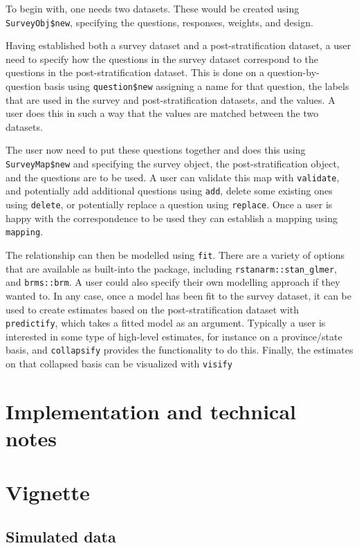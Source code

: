 \documentclass[
]{jss}
\begin{document}
To begin with, one needs two datasets. These would be created using
\texttt{SurveyObj\$new}, specifying the questions, responses, weights,
and design.

Having established both a survey dataset and a post-stratification
dataset, a user need to specify how the questions in the survey dataset
correspond to the questions in the post-stratification dataset. This is
done on a question-by-question basis using \texttt{question\$new}
assigning a name for that question, the labels that are used in the
survey and post-stratification datasets, and the values. A user does
this in such a way that the values are matched between the two datasets.

The user now need to put these questions together and does this using
\texttt{SurveyMap\$new} and specifying the survey object, the
post-stratification object, and the questions are to be used. A user can
validate this map with \texttt{validate}, and potentially add additional
questions using \texttt{add}, delete some existing ones using
\texttt{delete}, or potentially replace a question using
\texttt{replace}. Once a user is happy with the correspondence to be
used they can establish a mapping using \texttt{mapping}.

The relationship can then be modelled using \texttt{fit}. There are a
variety of options that are available as built-into the package,
including \texttt{rstanarm::stan\_glmer}, and \texttt{brms::brm}. A user
could also specify their own modelling approach if they wanted to. In
any case, once a model has been fit to the survey dataset, it can be
used to create estimates based on the post-stratification dataset with
\texttt{predictify}, which takes a fitted model as an argument.
Typically a user is interested in some type of high-level estimates, for
instance on a province/state basis, and \texttt{collapsify} provides the
functionality to do this. Finally, the estimates on that collapsed basis
can be visualized with \texttt{visify}

\section{Implementation and technical notes} \label{sec:implementation}

\section{Vignette} \label{sec:vignette}

\subsection*{Simulated data}
\end{document}
